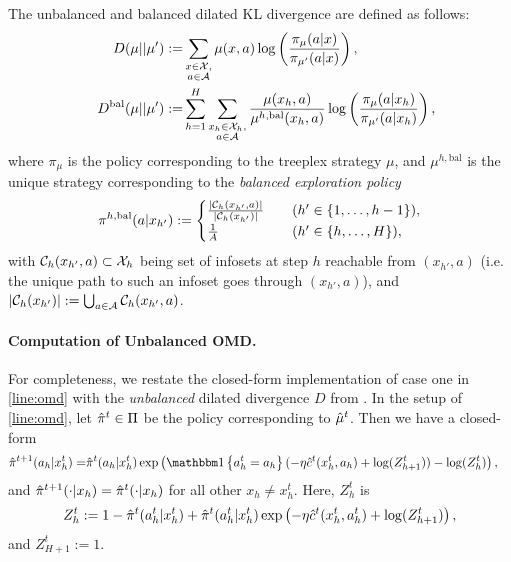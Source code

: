 The unbalanced and balanced dilated KL divergence are defined as follows:
\begin{align*}
    D(\mu || \mu') :=& \sum_{\substack{x\in\mathcal{X},\\a\in\mathcal{A}}} \mu(x,a) \log\left( \frac{\pi_{\mu}(a|x)}{\pi_{\mu'}(a|x)} \right),\\ \quad D^{\text{bal}}(\mu || \mu') :=& \sum_{h=1}^H\sum_{\substack{x_h \in \mathcal{X}_h,\\ a\in \mathcal{A}}} \frac{\mu(x_h,a)}{\mu^{h,\text{bal}}(x_h,a)} \log\left( \frac{\pi_{\mu}(a|x_h)}{\pi_{\mu'}(a|x_h)} \right),
\end{align*}
where $\pi_{\mu}$ is the policy corresponding to the treeplex strategy $\mu$, and $\mu^{h,\text{bal}}$ is the unique strategy corresponding to the \emph{balanced exploration policy}
\begin{align*}
        \pi^{h,\text{bal}}(a | x_{h'}) := \begin{cases}
        \frac{|\mathcal{C}_h(x_{h'},a)|}{|\mathcal{C}_h (x_{h'})|}&\quad (h'\in\{1,\dots,h-1\}),\\
        \frac{1}{A} &\quad (h'\in\{h,\dots,H\}),
    \end{cases}
\end{align*}
with $\mathcal{C}_h(x_{h'},a) \subset \mathcal{X}_h$ being set of infosets at step $h$ reachable from $(x_{h'},a)$ (i.e. the unique path to such an infoset goes through $(x_{h'},a)$), and $|\mathcal{C}_h (x_{h'})| := \bigcup_{a\in \mathcal{A}} \mathcal{C}_h(x_{h'},a)$.

\paragraph{Computation of Unbalanced OMD.}

\noindent For completeness, we restate the closed-form implementation of case one in \cref{line:omd} with the \emph{unbalanced} dilated divergence $D$ from \citet[Appendix B]{kozuno2021model}. In the setup of \cref{line:omd}, let $\hat{\pi}^t\in\Pi$ be the policy corresponding to $\hat{\mu}^t$. Then we have a closed-form
\begin{align*}
    \piHat^{t+1}(a_h|x_h^t) =& \piHat^t(a_h|x_h^t) \exp\round{\indicator{a_h^t=a_h}(-\eta\cHat^t(x_h^t,a_h)+\log(Z^t_{h+1}))-\log(Z^t_{h})},
\end{align*}
and $\hat{\pi}^{t+1}(\cdot|x_h)=\hat{\pi}^{t}(\cdot|x_h)$ for all other $x_h\neq x_h^t$. Here, $Z_h^t$ is
\begin{align*}
    Z_h^t := 1-\hat{\pi}^t(a_h^t|x_h^t)+\hat{\pi}^t(a_h^t|x_h^t)\exp\left( -\eta\hat{c}^t(x_h^t,a_h^t)+\log(Z^t_{h+1}) \right),
\end{align*}
and $Z_{H+1}^t := 1$.

